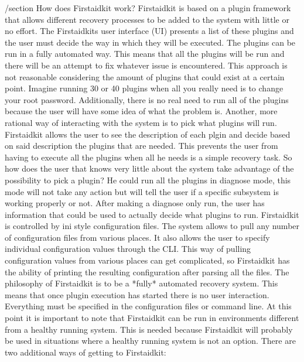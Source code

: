 /section{ How does Firstaidkit work? }
Firstaidkit is based on a plugin framework that allows different recovery processes to be added to the system with little or no effort.  The Firstaidkits user interface (UI) presents a list of these plugins and the user must decide the way in which they will be executed.  The plugins can be run in a fully automated way.  This means that all the plugins will be run and there will be an attempt to fix whatever issue is encountered.  This approach is not reasonable considering the amount of plugins that could exist at a certain point.  Imagine running 30 or 40 plugins when all you really need is to change your root password.  Additionally, there is no real need to run all of the plugins because the user will have some idea of what the problem is.
Another, more rational way of interacting with the system is to pick what plugins will run.  Firstaidkit allows the user to see the description of each plgin and decide based on said description the plugins that are needed.  This prevents the user from having to execute all the plugins when all he needs is a simple recovery task.
So how does the user that knows very little about the system take advantage of the possibility to pick a plugin?  He could run all the plugins in diagnose mode, this mode will not take any action but will tell the user if a specific subsystem is working properly or not.  After making a diagnose only run, the user has information that could be used to actually decide what plugins to run.
Firstaidkit is controlled by ini style configuration files.  The system allows to pull any number of configuration files from various places.  It also allows the user to specify individual configuration values through the CLI.  This way of pulling configuration values from various places can get complicated, so Firstaidkit has the ability of printing the resulting configuration after parsing all the files.
The philosophy of Firstaidkit is to be a *fully* automated recovery system.  This means that once plugin execution has started there is no user interaction.  Everything must be specified in the configuration files or command line.
At this point it is important to note that Firstaidkit can be run in environments different from a healthy running system.  This is needed because Firstaidkit will probably be used in situations where a healthy running system is not an option.  There are two additional ways of getting to Firstaidkit:

